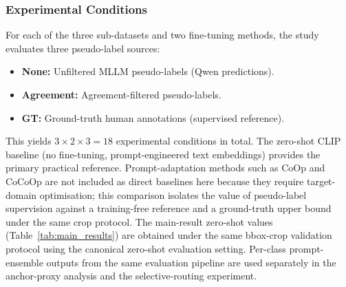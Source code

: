 \documentclass{ieeeaccess}
\begin{document}
\subsubsection{Experimental Conditions}

For each of the three sub-datasets and two fine-tuning methods,
the study evaluates three pseudo-label sources:

\begin{itemize}
    \item \textbf{None:} Unfiltered MLLM pseudo-labels (Qwen predictions).
    \item \textbf{Agreement:} Agreement-filtered pseudo-labels.
    \item \textbf{GT:} Ground-truth human annotations (supervised reference).
\end{itemize}

This yields $3 \times 2 \times 3 = 18$ experimental conditions in total.
The zero-shot CLIP baseline (no fine-tuning,
prompt-engineered text embeddings) provides the primary practical
reference.
Prompt-adaptation methods such as CoOp and CoCoOp are not included as
direct baselines here because they require target-domain optimisation;
this comparison isolates the value of pseudo-label supervision
against a training-free reference and a ground-truth upper bound under
the same crop protocol.
The main-result zero-shot values (Table~\ref{tab:main_results}) are
obtained under the same bbox-crop validation protocol using the
canonical zero-shot evaluation setting.
Per-class prompt-ensemble outputs from the same
evaluation pipeline are used separately in the anchor-proxy
analysis and the selective-routing experiment.
\end{document}
